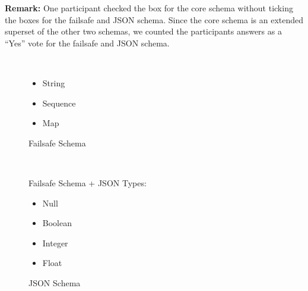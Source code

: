 \documentclass[a4paper, svgnames, 12pt]{article}
\begin{document}
\textbf{Remark:} One participant checked the box for the core schema without ticking the boxes for the failsafe and JSON schema. Since the core schema is an extended superset of the other two schemas, we counted the participants answers as a “Yes” vote for the failsafe and JSON schema.

\begin{figure}[H]
  \begin{minipage}[t]{0.48\textwidth}
    \vspace{0pt}
    \begin{bchart}[max=9, width=0.85\textwidth]
      \bcxlabel{}
    \end{bchart}
  \end{minipage}
  \begin{minipage}[t]{0pt}~\end{minipage}
  \begin{minipage}[t]{0.48\textwidth}
    \begin{itemize}
      \item String
      \item Sequence
      \item Map
    \end{itemize}
  \end{minipage}
  \caption{Failsafe Schema}
\end{figure}

\begin{figure}[H]
  \begin{minipage}[t]{0.48\textwidth}
    \vspace{0pt}
    \begin{bchart}[max=9, width=0.85\textwidth]
    \end{bchart}
  \end{minipage}
  \begin{minipage}[t]{0pt}~\end{minipage}
  \begin{minipage}[t]{0.48\textwidth}
    \vspace{0pt}
    Failsafe Schema + JSON Types:
    \begin{itemize}
      \item Null
      \item Boolean
      \item Integer
      \item Float
    \end{itemize}
  \end{minipage}
  \caption{JSON Schema}
\end{figure}
\end{document}
